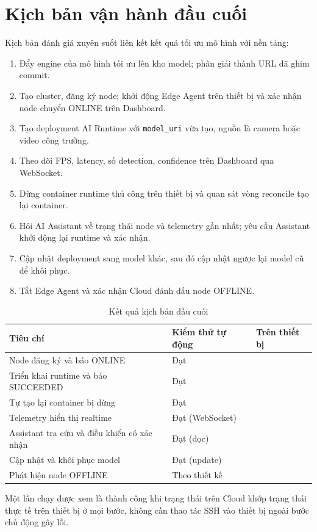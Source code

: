 \section{Kịch bản vận hành đầu cuối}

Kịch bản đánh giá xuyên suốt liên kết kết quả tối ưu mô hình với nền tảng:

\begin{enumerate}
  \item Đẩy engine của mô hình tối ưu lên kho model; phân giải thành URL đã ghim
        commit.
  \item Tạo cluster, đăng ký node; khởi động Edge Agent trên thiết bị và xác nhận
        node chuyển ONLINE trên Dashboard.
  \item Tạo deployment AI Runtime với \texttt{model\_uri} vừa tạo, nguồn là camera
        hoặc video công trường.
  \item Theo dõi FPS, latency, số detection, confidence trên Dashboard qua
        WebSocket.
  \item Dừng container runtime thủ công trên thiết bị và quan sát vòng reconcile
        tạo lại container.
  \item Hỏi AI Assistant về trạng thái node và telemetry gần nhất; yêu cầu
        Assistant khởi động lại runtime và xác nhận.
  \item Cập nhật deployment sang model khác, sau đó cập nhật ngược lại model cũ
        để khôi phục.
  \item Tắt Edge Agent và xác nhận Cloud đánh dấu node OFFLINE.
\end{enumerate}

\begin{table}[H]
\centering
\caption{Kết quả kịch bản đầu cuối}
\label{tab:e2e-scenario}
\begin{tabularx}{\textwidth}{L{5.4cm}C{2.6cm}Y}
\toprule
\textbf{Tiêu chí} & \textbf{Kiểm thử tự động} & \textbf{Trên thiết bị}\\
\midrule
Node đăng ký và báo ONLINE & Đạt & \cbs{}\\
Triển khai runtime và báo SUCCEEDED & Đạt & \cbs{}\\
Tự tạo lại container bị dừng & Đạt & \cbs{}\\
Telemetry hiển thị realtime & Đạt (WebSocket) & \cbs{}\\
Assistant tra cứu và điều khiển có xác nhận & Đạt (đọc) & \cbs{}\\
Cập nhật và khôi phục model & Đạt (update) & \cbs{}\\
Phát hiện node OFFLINE & Theo thiết kế & \cbs{}\\
\bottomrule
\end{tabularx}
\end{table}

Một lần chạy được xem là thành công khi trạng thái trên Cloud khớp trạng thái
thực tế trên thiết bị ở mọi bước, không cần thao tác SSH vào thiết bị ngoài bước
chủ động gây lỗi.
